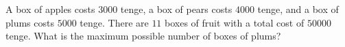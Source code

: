 A box of apples costs $3000$ tenge, a box of pears costs $4000$ tenge, and a box of plums costs $5000$ tenge. There are $11$ boxes of fruit with a total cost of $50000$ tenge. What is the maximum possible number of boxes of plums?
